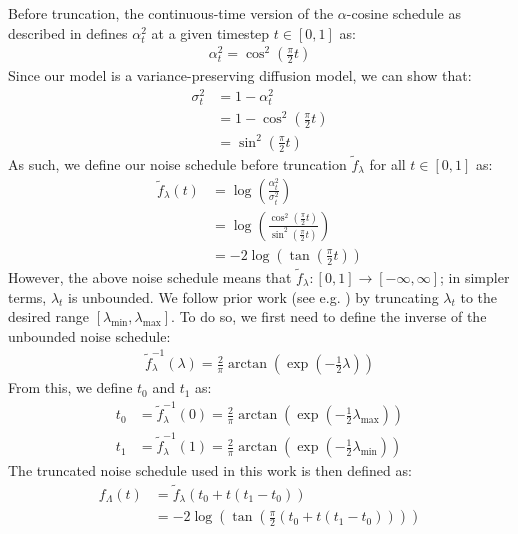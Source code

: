 \documentclass[ oneside,%
                    author={George Herbert},
                    degree={MSci},
                     title={Video Diffusion Models for Climate Simulations},
                  subtitle={}]{dissertation}
\begin{document}
Before truncation, the continuous-time version of the $\alpha$-cosine schedule \cite{IDDPM_Nichol} as described in \cite{Simple_Diffusion_Hoogeboom} defines $\alpha_t^2$ at a given timestep $t\in[0,1]$ as:
\begin{align}
      \alpha_t^2=\cos^2\left(\frac{\pi}{2}t\right)
\end{align}
Since our model is a variance-preserving diffusion model, we can show that:
\begin{align}
      \sigma_t^2&=1-\alpha_t^2\\
      &=1-\cos^2\left(\frac{\pi}{2}t\right)\\
      &=\sin^2\left(\frac{\pi}{2}t\right)
\end{align}
As such, we define our noise schedule before truncation $\tilde{f}_\lambda$ for all $t\in[0,1]$ as:
\begin{align}
      \tilde{f}_\lambda(t)&=\log\left(\frac{\alpha_t^2}{\sigma_t^2}\right)\\
      &=\log\left(\frac{\cos^2\left(\frac{\pi}{2}t\right)}{\sin^2\left(\frac{\pi}{2}t\right)}\right)\\
      &=-2\log\left(\tan\left(\frac{\pi}{2}t\right)\right)
\end{align}
However, the above noise schedule means that $\tilde{f}_\lambda:[0,1]\to[-\infty, \infty]$; in simpler terms, $\lambda_t$ is unbounded. We follow prior work (see e.g. \cite{Simple_Diffusion_Hoogeboom,VDM_Ho}) by truncating $\lambda_t$ to the desired range $[\lambda_{\min}, \lambda_{\max}]$. To do so, we first need to define the inverse of the unbounded noise schedule:
\begin{align}
      \tilde{f}_\lambda^{-1}(\lambda)=\frac{2}{\pi}\arctan\left(\exp\left(-\frac{1}{2}\lambda\right)\right)
\end{align}
From this, we define $t_0$ and $t_1$ as:
\begin{align}
      t_0&=\tilde{f}_\lambda^{-1}(0)=\frac{2}{\pi}\arctan\left(\exp\left(-\frac{1}{2}\lambda_{\max}\right)\right)\\
      t_1&=\tilde{f}_\lambda^{-1}(1)=\frac{2}{\pi}\arctan\left(\exp\left(-\frac{1}{2}\lambda_{\min}\right)\right)
\end{align}
The truncated noise schedule used in this work is then defined as:
\begin{align}
      f_\Lambda(t)&=\tilde{f}_\lambda(t_0+t(t_1-t_0))\\
      &=-2\log\left(\tan\left(\frac{\pi}{2}(t_0+t(t_1-t_0))\right)\right)
\end{align}
\end{document}
